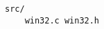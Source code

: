 \clearpage
{}\label{win32}\secdown

\begin{verbatim}
src/
    win32.c win32.h
\end{verbatim}
    
\secup
